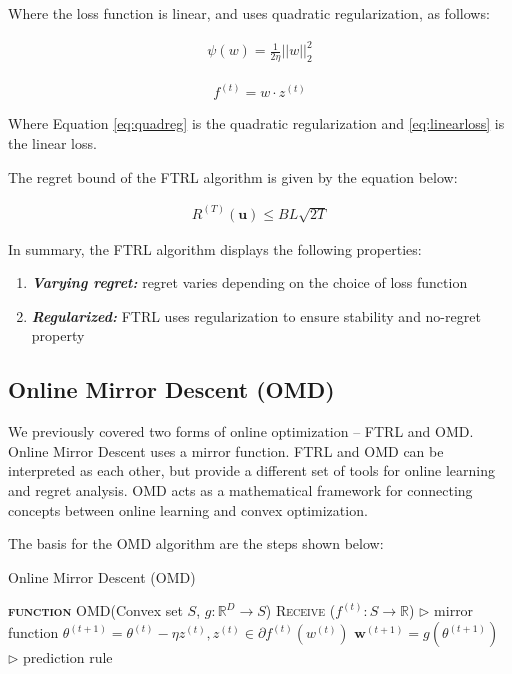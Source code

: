 \documentclass[11pt]{article}
\begin{document}
Where the loss function is linear, and uses quadratic regularization, as follows:

\begin{align}
    \psi(w) = \frac{1}{2\eta} ||w||_2^2 \label{eq:quadreg}
\end{align}

\begin{align}
    f^{(t)} = w \cdot z^{(t)} \label{eq:linearloss}
\end{align}

Where Equation \ref{eq:quadreg} is the quadratic regularization and \ref{eq:linearloss} is the linear loss.

The regret bound of the FTRL algorithm is given by the equation below:

\begin{align}
    R^{(T)}(\textbf{u}) \leq BL \sqrt{2T} \label{eq:FTRLregret}
\end{align}


In summary, the FTRL algorithm displays the following properties:

\begin{enumerate}
    \item \textbf{\textit{Varying regret:}} regret varies depending on the choice of loss function
    \item \textbf{\textit{Regularized:}} FTRL uses regularization to ensure stability and no-regret property
\end{enumerate}


\subsection{Online Mirror Descent (OMD)}
We previously covered two forms of online optimization – FTRL and OMD. Online Mirror Descent uses a mirror function. FTRL and OMD can be interpreted as each other, but provide a different set of tools for online learning and regret analysis. OMD acts as a mathematical framework for connecting concepts between online learning and convex optimization.

The basis for the OMD algorithm are the steps shown below:

\begin{algorithm}[H]
\caption{Online Mirror Descent (OMD)}
\label{algo:omd}
\begin{algorithmic}[1]
\STATE \textsc{\textbf{function}} OMD(Convex set $S$, $g : \mathbb{R}^D \rightarrow S$)
\STATE \textsc{Receive} ($f^{(t)} : S \rightarrow \mathbb{R}$) \hfill $\triangleright$ mirror function
\STATE $\theta^{(t+1)} = {\theta}^{(t)} - \eta z^{(t)}, z^{(t)} \in \partial f^{(t)}(w^{(t)})$
\STATE $\textbf{w}^{(t+1)} = g(\theta^{(t+1)})$ \hfill $\triangleright$ prediction rule 
\ENDFOR
\end{algorithmic}
\end{algorithm}
\end{document}
